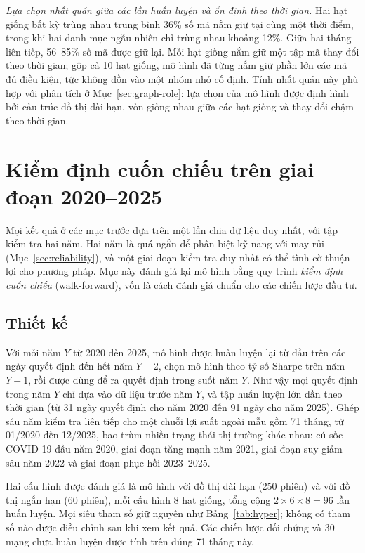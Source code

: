 \textit{Lựa chọn nhất quán giữa các lần huấn luyện và ổn định theo thời gian.} Hai hạt giống bất kỳ trùng nhau trung bình 36\% số mã nắm giữ tại cùng một thời điểm, trong khi hai danh mục ngẫu nhiên chỉ trùng nhau khoảng 12\%. Giữa hai tháng liên tiếp, 56--85\% số mã được giữ lại. Mỗi hạt giống nắm giữ một tập mã thay đổi theo thời gian; gộp cả 10 hạt giống, mô hình đã từng nắm giữ phần lớn các mã đủ điều kiện, tức không dồn vào một nhóm nhỏ cố định. Tính nhất quán này phù hợp với phân tích ở Mục~\ref{sec:graph-role}: lựa chọn của mô hình được định hình bởi cấu trúc đồ thị dài hạn, vốn giống nhau giữa các hạt giống và thay đổi chậm theo thời gian.

\section{Kiểm định cuốn chiếu trên giai đoạn 2020--2025}
\label{sec:walkforward}

Mọi kết quả ở các mục trước dựa trên một lần chia dữ liệu duy nhất, với tập kiểm tra hai năm. Hai năm là quá ngắn để phân biệt kỹ năng với may rủi (Mục~\ref{sec:reliability}), và một giai đoạn kiểm tra duy nhất có thể tình cờ thuận lợi cho phương pháp. Mục này đánh giá lại mô hình bằng quy trình \emph{kiểm định cuốn chiếu} (walk-forward), vốn là cách đánh giá chuẩn cho các chiến lược đầu tư.

\subsection{Thiết kế}

Với mỗi năm $Y$ từ 2020 đến 2025, mô hình được huấn luyện lại từ đầu trên các ngày quyết định đến hết năm $Y-2$, chọn mô hình theo tỷ số Sharpe trên năm $Y-1$, rồi được dùng để ra quyết định trong suốt năm $Y$. Như vậy mọi quyết định trong năm $Y$ chỉ dựa vào dữ liệu trước năm $Y$, và tập huấn luyện lớn dần theo thời gian (từ 31 ngày quyết định cho năm 2020 đến 91 ngày cho năm 2025). Ghép sáu năm kiểm tra liên tiếp cho một chuỗi lợi suất ngoài mẫu gồm 71 tháng, từ 01/2020 đến 12/2025, bao trùm nhiều trạng thái thị trường khác nhau: cú sốc COVID-19 đầu năm 2020, giai đoạn tăng mạnh năm 2021, giai đoạn suy giảm sâu năm 2022 và giai đoạn phục hồi 2023--2025.

Hai cấu hình được đánh giá là mô hình với đồ thị dài hạn (250 phiên) và với đồ thị ngắn hạn (60 phiên), mỗi cấu hình 8 hạt giống, tổng cộng $2\times6\times8=96$ lần huấn luyện. Mọi siêu tham số giữ nguyên như Bảng~\ref{tab:hyper}; không có tham số nào được điều chỉnh sau khi xem kết quả. Các chiến lược đối chứng và 30 mạng chưa huấn luyện được tính trên đúng 71 tháng này.

